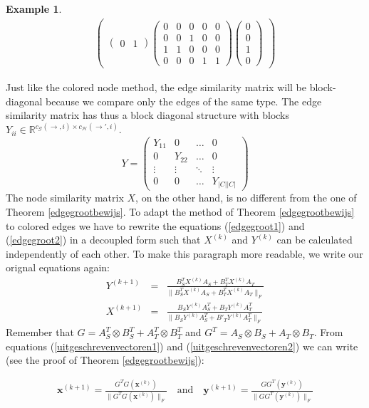 \documentclass[a4paper,11pt]{report}
\newtheorem{example}[theorem]{Example}
\newcommand{\R}{{\mathbb R}}
\newcommand{\graf}{\mathscr{G}}
\newcommand{\grafeen}{\mathscr{H}}
\begin{document}
\begin{example}
\begin{eqnarray*}
\begin{pmatrix}
\begin{pmatrix}
0&1
\end{pmatrix}
\begin{pmatrix}
0&0&0&0&0\\
0&0&1&0&0\\
1&1&0&0&0\\
0&0&0&1&1
\end{pmatrix}
\begin{pmatrix}
0\\
0\\
1\\
0
\end{pmatrix}
\end{pmatrix}
\end{eqnarray*}
\end{example}

Just like the colored node method, the edge similarity matrix will be 
block-diagonal because we compare only the edges of the same type. The edge 
similarity matrix has thus a block diagonal structure with blocks $Y_{ii} \in \R^{c_\graf(\to, i) \times c_\grafeen(\to', 
i)}$.
$$Y = \begin{pmatrix}
Y_{11} & 0 & \ldots & 0\\
0 & Y_{22} & \ldots & 0\\
\vdots & \vdots & \ddots & \vdots \\
0 & 0 & \ldots & Y_{|C||C|}
\end{pmatrix}$$
The node similarity matrix $X$, on the other hand, is no different from the one 
of Theorem \ref{edgegrootbewijs}. To adapt the method of Theorem 
\ref{edgegrootbewijs} to colored edges we have to rewrite the equations (\ref{edgegroot1}) 
and (\ref{edgegroot2}) in a decoupled form such that $X^{(k)}$ and $Y^{(k)}$ can 
be calculated independently of each other. To make this paragraph more readable, we write our orignal equations again:
 \begin{eqnarray*}
  Y^{(k+1)} &=& \frac{B_S^TX^{(k)}A_S + B_T^TX^{(k)}A_T}{\|B_S^TX^{(k)}A_S + 
  B_T^TX^{(k)}A_T\|_F}\\
   X^{(k+1)} &=& \frac{B_SY^{(k)}A_S^T + B_TY^{(k)}A^T_T}{\|B_SY^{(k)}A_S^T + 
   B'_TY^{(k)}A^T_T\|_F}
 \end{eqnarray*}
Remember that $G = A^T_S \otimes B^T_S + A^T_T \otimes B^T_T$ 
and $G^T = A_S \otimes B_S + A_T \otimes B_T$. From equations (\ref{uitgeschrevenvectoren1}) 
and (\ref{uitgeschrevenvectoren2}) we can write (see the proof of Theorem \ref{edgegrootbewijs}):

\begin{eqnarray}
  \mathbf{x}^{(k+1)} = \frac{G^TG(\mathbf{x}^{(k)})}{\|G^TG(\mathbf{x}^{(k)})\|_F} 
\quad \text{and} \quad \mathbf{y}^{(k+1)} = 
\frac{GG^T(\mathbf{y}^{(k)})}{\|GG^T(\mathbf{y}^{(k)})\|_F}\label{decoupled}\end{eqnarray}
\end{document}
